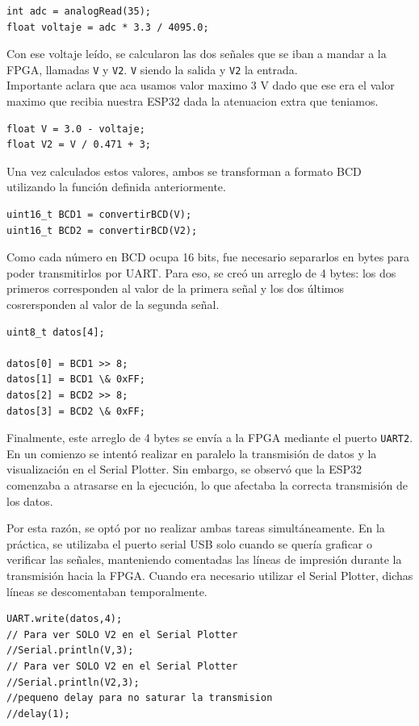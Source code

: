 \documentclass[letterpaper, 12pt]{article}
\begin{document}
\begin{lstlisting}
int adc = analogRead(35);
float voltaje = adc * 3.3 / 4095.0;
\end{lstlisting}

Con ese voltaje leído, se calcularon las dos señales que se iban a mandar a la FPGA, llamadas \texttt{V} y \texttt{V2}. \texttt{V} siendo la salida y \texttt{V2} la entrada. \\

Importante aclara que aca usamos valor maximo 3 V dado que ese era el valor maximo que recibia nuestra ESP32 dada la atenuacion extra que teniamos.

\begin{lstlisting}
float V = 3.0 - voltaje;
float V2 = V / 0.471 + 3;
\end{lstlisting}

Una vez calculados estos valores, ambos se transforman a formato BCD utilizando la función definida anteriormente. 

\begin{lstlisting}
uint16_t BCD1 = convertirBCD(V);
uint16_t BCD2 = convertirBCD(V2);
\end{lstlisting}

Como cada número en BCD ocupa 16 bits, fue necesario separarlos en bytes para poder transmitirlos por UART. Para eso, se creó un arreglo de 4 bytes: los dos primeros corresponden al valor de la primera señal y los dos últimos cosrersponden al valor de la segunda señal.

\begin{lstlisting}
uint8_t datos[4];

datos[0] = BCD1 >> 8;
datos[1] = BCD1 \& 0xFF;
datos[2] = BCD2 >> 8;
datos[3] = BCD2 \& 0xFF;
\end{lstlisting}

Finalmente, este arreglo de 4 bytes se envía a la FPGA mediante el puerto \texttt{UART2}. En un comienzo se intentó realizar en paralelo la transmisión de datos y la visualización en el Serial Plotter. Sin embargo, se observó que la ESP32 comenzaba a atrasarse en la ejecución, lo que afectaba la correcta transmisión de los datos. 

Por esta razón, se optó por no realizar ambas tareas simultáneamente. En la práctica, se utilizaba el puerto serial USB solo cuando se quería graficar o verificar las señales, manteniendo comentadas las líneas de impresión durante la transmisión hacia la FPGA. Cuando era necesario utilizar el Serial Plotter, dichas líneas se descomentaban temporalmente.
\begin{lstlisting}
UART.write(datos,4);
// Para ver SOLO V2 en el Serial Plotter 
//Serial.println(V,3); 
// Para ver SOLO V2 en el Serial Plotter  
//Serial.println(V2,3); 
//pequeno delay para no saturar la transmision 
//delay(1);
\end{lstlisting}
\end{document}
